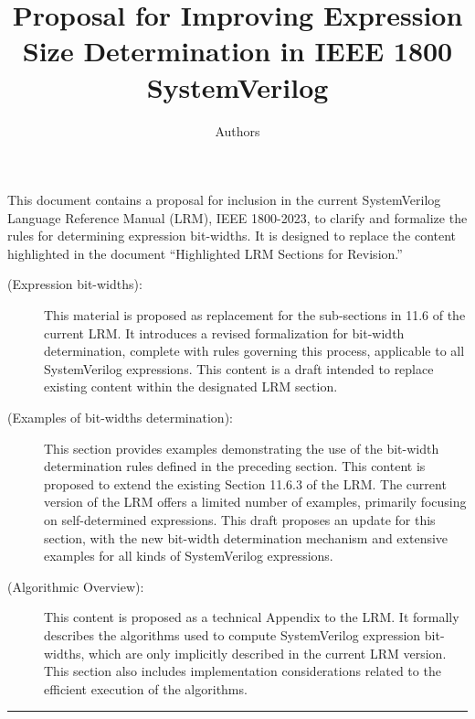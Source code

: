 \documentclass{article}
\title{Proposal for Improving Expression Size Determination in IEEE 1800
SystemVerilog}
\author{Authors}
\date{}
\begin{document}
\maketitle

This document contains a proposal for inclusion in the current SystemVerilog
Language Reference Manual (LRM), IEEE 1800-2023, to clarify and formalize the
rules for determining expression bit-widths. It is designed to replace the
content highlighted in the document ``Highlighted LRM Sections for Revision.''

\begin{description}
  \item[ (Expression bit-widths):]
    This material is proposed as replacement for the sub-sections in 11.6 of the
    current LRM. It introduces a revised formalization for bit-width
    determination, complete with rules governing this process, applicable to
    all SystemVerilog expressions. This content is a draft intended to
    replace existing content within the designated LRM section.

  \item[ (Examples of bit-widths determination):]
    This section provides examples demonstrating the use of the bit-width
    determination rules defined in the preceding section. This content is
    proposed to extend the existing Section 11.6.3 of the LRM. The current
    version of the LRM offers a limited number of examples, primarily
    focusing on self-determined expressions. This draft proposes an update
    for this section, with the new bit-width determination mechanism and
    extensive examples for all kinds of SystemVerilog expressions.

  \item[ (Algorithmic Overview):]
    This content is proposed as a technical Appendix to the LRM. It formally
    describes the algorithms used to compute SystemVerilog expression
    bit-widths, which are only implicitly described in the current LRM
    version. This section also includes implementation considerations
    related to the efficient execution of the algorithms.
\end{description}

\begin{center}
  \noindent\rule{.8\textwidth}{1pt}
\end{center}

\renewcommand{\thesection}{11.6.\arabic{section}}
\setcounter{section}{0}
\end{document}
